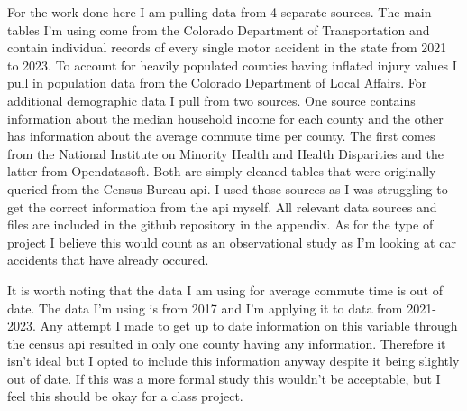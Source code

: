 For the work done here I am pulling data from 4 separate sources. The main tables I'm using come from the Colorado Department of Transportation and contain individual records of every single motor accident in the state from 2021 to 2023. To account for heavily populated counties having inflated injury values I pull in population data from the Colorado Department of Local Affairs. For additional demographic data I pull from two sources. One source contains information about the median household income for each county and the other has information about the average commute time per county. The first comes from the National Institute on Minority Health and Health Disparities and the latter from Opendatasoft. Both are simply cleaned tables that were originally queried from the Census Bureau api. I used those sources as I was struggling to get the correct information from the api myself. All relevant data sources and files are included in the github repository in the appendix. As for the type of project I believe this would count as an observational study as I'm looking at car accidents that have already occured. 

It is worth noting that the data I am using for average commute time is out of date. The data I'm using is from 2017 and I'm applying it to data from 2021-2023. Any attempt I made to get up to date information on this variable through the census api resulted in only one county having any information. Therefore it isn't ideal but I opted to include this information anyway despite it being slightly out of date. If this was a more formal study this wouldn't be acceptable, but I feel this should be okay for a class project. 